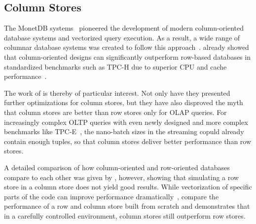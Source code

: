 \subsection{Column Stores}

The MonetDB systems~\cite{DBLP:conf/cidr/BonczZN05,DBLP:journals/vldb/BonczK99} pioneered the development of modern column-oriented database systems and vectorized query execution.
As a result, a wide range of columnar database systems was created to follow this approach~\cite{DBLP:conf/sigmod/SikkaFLCPB12,DBLP:conf/vldb/StonebrakerABCCFLLMOORTZ05,DBLP:conf/icde/ZukowskiWB12,DBLP:journals/pvldb/GrundKPZCM10}.
\citet{DBLP:journals/pvldb/LiarouIMK12} already showed that column-oriented designs can significantly outperform row-based databases in standardized benchmarks such as TPC-H due to superior CPU and cache performance~\cite{DBLP:conf/sigmod/AbadiMH08}.

The work of \citet{DBLP:conf/sigmod/SikkaFLCPB12} is thereby of particular interest.
Not only have they presented further optimizations for column stores, but they have also disproved the myth that column stores are better than row stores only for OLAP queries.
For increasingly complex OLTP queries with even newly designed and more complex benchmarks like TPC-E~\cite{DBLP:conf/sigmod/SikkaFLCPB12,DBLP:conf/edbt/TozunPKJA13,tpce}, the nano-batch sizes in the streaming copuld already contain enough tuples, so that column stores deliver better performance than row stores.

A detailed comparison of how column-oriented and row-oriented databases compare to each other was given by \citet{DBLP:conf/sigmod/AbadiMH08}, however, showing that simulating a row store in a column store does not yield good results.
While vectorization of specific parts of the code can improve performance dramatically~\cite{DBLP:journals/pvldb/KerstenLKNPB18}, \citet{DBLP:conf/vldb/HarizopoulosLAM06} compare the performance of a row and column store built from scratch and demonstrates that in a carefully controlled environment, column stores still outperform row stores.